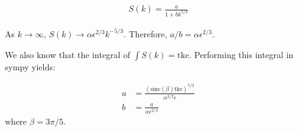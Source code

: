 \documentclass{article}
\def\tke{\ensuremath{\mathrm{tke}}}
\def\sinc{\ensuremath{\mathrm{sinc}}}
\begin{document}
\begin{align}
  S(k) = \frac{a}{1 + b k^{5/3}}
\end{align}

As $k \rightarrow \infty$, $S(k) \rightarrow \alpha
\epsilon^{2/3}k^{-5/3}$. Therefore, $a/b = \alpha\epsilon^{2/3}$.

We also know that the integral of $\int S(k) = \tke$. Performing this integral in sympy yields:

\begin{align}
  a &=  \frac{(\sinc(\beta) \tke)^{5/2}}{\alpha^{3/2} \epsilon}\\
  b &= \frac{a}{\alpha\epsilon^{2/3}}
\end{align}
where $\beta = 3\pi/5$.



\end{document}
